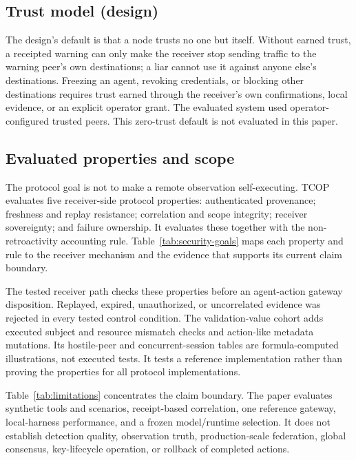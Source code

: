 \subsection{Trust model (design)}

The design's default is that a node trusts no one but itself. Without earned trust, a receipted warning can only make the receiver stop sending traffic to the warning peer's own destinations; a liar cannot use it against anyone else's destinations. Freezing an agent, revoking credentials, or blocking other destinations requires trust earned through the receiver's own confirmations, local evidence, or an explicit operator grant. The evaluated system used operator-configured trusted peers. This zero-trust default is not evaluated in this paper.

\subsection{Evaluated properties and scope}

The protocol goal is not to make a remote observation self-executing. TCOP evaluates five receiver-side protocol properties: authenticated provenance; freshness and replay resistance; correlation and scope integrity; receiver sovereignty; and failure ownership. It evaluates these together with the non-retroactivity accounting rule. Table~\ref{tab:security-goals} maps each property and rule to the receiver mechanism and the evidence that supports its current claim boundary.



The tested receiver path checks these properties before an agent-action gateway disposition. Replayed, expired, unauthorized, or uncorrelated evidence was rejected in every tested control condition. The validation-value cohort adds executed subject and resource mismatch checks and action-like metadata mutations. Its hostile-peer and concurrent-session tables are formula-computed illustrations, not executed tests. It tests a reference implementation rather than proving the properties for all protocol implementations.

Table~\ref{tab:limitations} concentrates the claim boundary. The paper evaluates synthetic tools and scenarios, receipt-based correlation, one reference gateway, local-harness performance, and a frozen model/runtime selection. It does not establish detection quality, observation truth, production-scale federation, global consensus, key-lifecycle operation, or rollback of completed actions.

